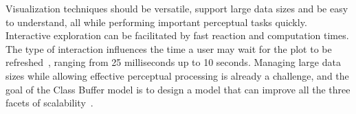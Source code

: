 Visualization techniques should be versatile, support large data sizes and be easy to understand, all while performing important perceptual tasks quickly. Interactive exploration can be facilitated by fast reaction and computation times. The type of interaction influences the time a user may wait for the plot to be refreshed~\cite{miller1968response, shneiderman1984response}, ranging from 25 milliseconds up to 10 seconds.
Managing large data sizes while allowing effective perceptual processing is already a challenge, and the goal of the Class Buffer model is to design a model that can improve all the three facets of scalability~\cite{jo2019declarative}.




